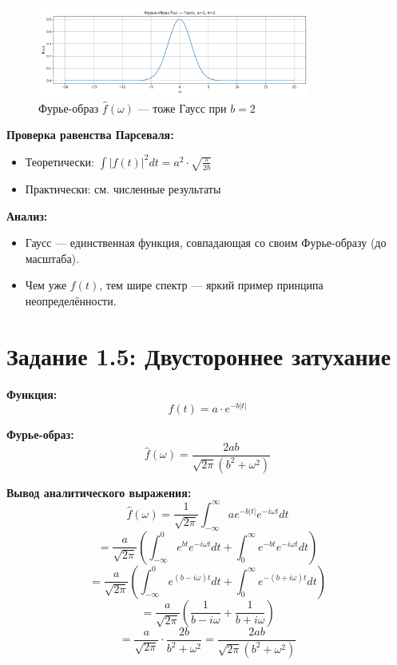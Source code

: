 \begin{figure}[H]
    \centering
    \includegraphics[width=0.8\textwidth]{gauss_spectrum_b2.png}
    \caption{Фурье-образ $\hat{f}(\omega)$ — тоже Гаусс при $b = 2$}
\end{figure}

\textbf{Проверка равенства Парсеваля:}

\begin{itemize}
    \item Теоретически: $\displaystyle \int |f(t)|^2 dt = a^2 \cdot \sqrt{\frac{\pi}{2b}}$
    \item Практически: см. численные результаты
\end{itemize}

\textbf{Анализ:}

\begin{itemize}
    \item Гаусс — единственная функция, совпадающая со своим Фурье-образу (до масштаба).
    \item Чем уже $f(t)$, тем шире спектр — яркий пример принципа неопределённости.
\end{itemize}

\section*{Задание 1.5: Двустороннее затухание}

\textbf{Функция:}
\[
f(t) = a \cdot e^{-b |t|}
\]

\textbf{Фурье-образ:}
\[
\hat{f}(\omega) = \frac{2ab}{\sqrt{2\pi}(b^2 + \omega^2)}
\]

\textbf{Вывод аналитического выражения:}
\[
\hat{f}(\omega) = \frac{1}{\sqrt{2\pi}} \int_{-\infty}^{\infty} a e^{-b |t|} e^{-i \omega t} dt
\]
\[
= \frac{a}{\sqrt{2\pi}} \left( \int_{-\infty}^{0} e^{b t} e^{-i \omega t} dt + \int_{0}^{\infty} e^{-b t} e^{-i \omega t} dt \right)
\]
\[
= \frac{a}{\sqrt{2\pi}} \left( \int_{-\infty}^{0} e^{(b - i \omega) t} dt + \int_{0}^{\infty} e^{-(b + i \omega) t} dt \right)
\]
\[
= \frac{a}{\sqrt{2\pi}} \left( \frac{1}{b - i \omega} + \frac{1}{b + i \omega} \right)
\]
\[
= \frac{a}{\sqrt{2\pi}} \cdot \frac{2b}{b^2 + \omega^2} = \frac{2ab}{\sqrt{2\pi}(b^2 + \omega^2)}
\]

